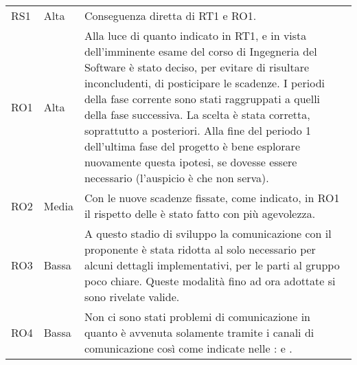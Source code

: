 {\begin{longtable}{C{2cm} C{3cm} C{10cm}}
RS1 &
Alta &
Conseguenza diretta di RT1 e RO1. \\

RO1 &
Alta &
Alla luce di quanto indicato in RT1, e in vista dell'imminente esame del corso di Ingegneria del Software è stato deciso, per evitare di risultare inconcludenti, di posticipare le scadenze. I periodi della fase corrente sono stati raggruppati a quelli della fase successiva. La scelta è stata corretta, soprattutto a posteriori. Alla fine del periodo 1 dell'ultima fase del progetto è bene esplorare nuovamente questa ipotesi, se dovesse essere necessario (l'auspicio è che non serva). \\

RO2 &
Media &
Con le nuove scadenze fissate, come indicato, in RO1 il rispetto delle  è stato fatto con più agevolezza. \\

RO3 &
Bassa &
A questo stadio di sviluppo la comunicazione con il proponente è stata ridotta al solo necessario per alcuni dettagli implementativi, per le parti al gruppo poco chiare. Queste modalità fino ad ora adottate si sono rivelate valide. \\

RO4 &
Bassa &
Non ci sono stati problemi di comunicazione in quanto è avvenuta solamente tramite i canali di comunicazione così come indicate nelle \NdP{}:  e . \\

\end{longtable}	
}